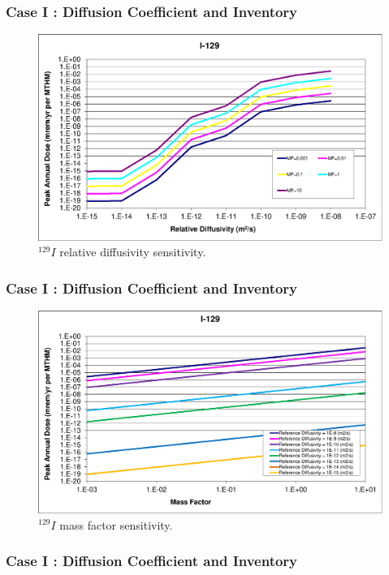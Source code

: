 \begin{frame}[c]
\begin{frame}[c]
  \frametitle{Case I : Diffusion Coefficient and Inventory}
\begin{figure}[ht]
\centering
\includegraphics[width=\linewidth]{DiffCoeffAndInvEBSFail/I-129.eps}
\caption{$^{129}I$ relative diffusivity sensitivity.}
\label{fig:DCInvI129}
\end{figure}
\end{frame}

\begin{frame}[c]
  \frametitle{Case I : Diffusion Coefficient and Inventory}
\begin{figure}[ht]
\centering
\includegraphics[width=\linewidth]{DiffCoeffAndInvEBSFail/I-129-MF.eps}
\caption{$^{129}I$ mass factor sensitivity.}
\label{fig:DCInvI129MF}
\end{figure}
\end{frame}

\begin{frame}[c]
  \frametitle{Case I : Diffusion Coefficient and Inventory}


\end{frame}
\end{frame}
